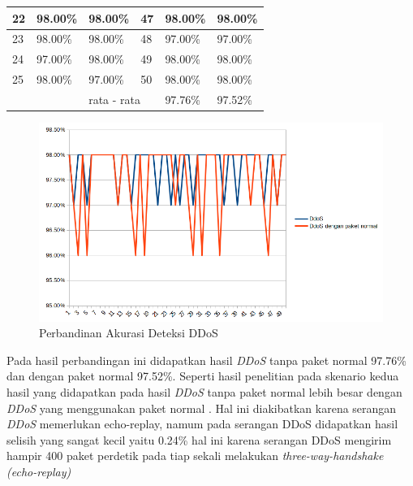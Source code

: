 \begin{table}[H]
\begin{tabular}{|l|l|l|l|l|l|}
			22 & 98.00\%                 & 98.00\%                    & 47  & 98.00\%                 & 98.00\%                  \\ \hline
			23 & 98.00\%                 & 98.00\%                    & 48  & 97.00\%                 & 97.00\%                  \\ \hline
			24 & 97.00\%                 & 98.00\%                    & 49  & 98.00\%                 & 98.00\%                  \\ \hline
			25 & 98.00\%                 & 97.00\%                    & 50  & 98.00\%                 & 98.00\%                  \\ \hline
			&                         & \multicolumn{2}{l|}{rata - rata} & 97.76\%                 & 97.52\%                  \\ \hline
		\end{tabular}
	\end{table}
	\newpage
	\begin{figure}[H]
		\centering
		\includegraphics[scale=0.7]{gambar/pddos}
		\caption{Perbandinan Akurasi Deteksi DDoS}
		\label{Perbandinan Akurasi Deteksi DDoS}
	\end{figure}
	
	Pada hasil perbandingan ini didapatkan hasil \emph{DDoS} tanpa paket normal 97.76\% dan dengan paket normal 97.52\%. Seperti hasil penelitian pada skenario kedua hasil yang didapatkan pada hasil \emph{DDoS} tanpa paket normal lebih besar dengan \emph{DDoS} yang menggunakan paket normal . Hal ini diakibatkan karena serangan \emph{DDoS} memerlukan echo-replay, namum pada serangan DDoS didapatkan hasil selisih yang sangat kecil yaitu 0.24\% hal ini karena serangan DDoS mengirim hampir 400 paket perdetik pada tiap sekali melakukan \emph{three-way-handshake (echo-replay)}
	

